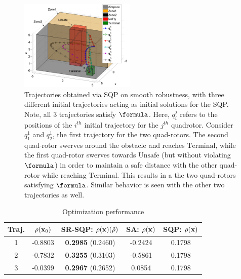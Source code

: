 

\begin{figure}[t]
\centering
\includegraphics[width=0.49\textwidth]{figures/QuadTrajs_scissored}
\caption{Trajectories obtained via SQP on smooth robustness, with three different initial trajectories acting as initial solutions for the SQP. Note, all 3 trajectories satisfy $\formula$. Here, $q_{i}^j$ refers to the positions of the $i^{th}$ initial trajectory for the $j^{th}$ quadrotor. Consider $q_{1}^1$ and $q_{2}^1$, the first trajectory for the two quad-rotors. The second quad-rotor swerves around the obstacle and reaches $\text{Terminal}$, while the first quad-rotor swerves towards $\text{Unsafe}$ (but without violating $\formula$) in order to maintain a safe distance with the other quad-rotor while reaching $\text{Terminal}$. This results in a the two quad-rotors satisfying $\formula$. Similar behavior is seen with the other two trajectories as well.}
\label{fig:quad_ssqp}
\end{figure}

{\small
\begin{table}[htb]
\begin{center}
\caption{Optimization performance}
\label{tbl:opt_performance}
\begin{tabular} {|c|c|c|c|c|}
	\hline
	\textbf{Traj.} & $\rho(\mathbf{x}_0) $ & SR-SQP: $\rho(\mathbf{x}) (\tilde{\rho})$ & SA: $\rho(\mathbf{x})$ & SQP: $\rho(\mathbf{x})$\\ \hline
	1 & -0.8803 & \textbf{0.2985} (0.2460) & -0.2424 & 0.1798 \\ \hline
	2 & -0.7832 & \textbf{0.3255} (0.3103) & -0.5861 & 0.1798 \\ \hline
	3 & -0.0399 & \textbf{0.2967} (0.2652) & 0.0854 & 0.1798 \\ \hline
\end{tabular}	
\end{center}
\end{table}
}


